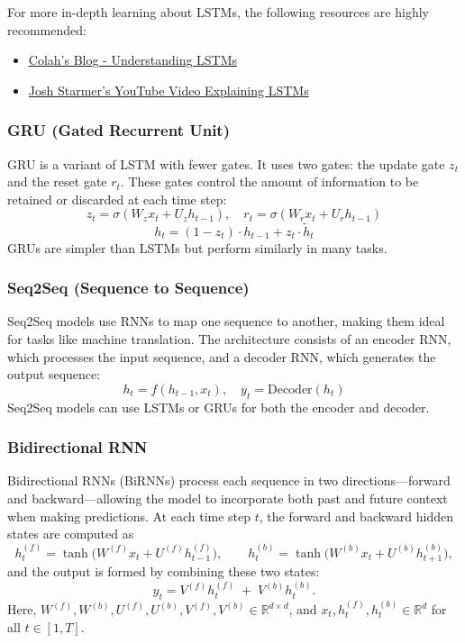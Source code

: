 \documentclass{article}
\begin{document}
For more in-depth learning about LSTMs, the following resources are highly recommended:
\begin{itemize}
    \item \href{https://colah.github.io/posts/2015-08-Understanding-LSTMs/}{Colah's Blog - Understanding LSTMs}
    \item \href{https://www.youtube.com/watch?v=YCzL96nL7j0}{Josh Starmer's YouTube Video Explaining LSTMs}
\end{itemize}

\subsubsection{GRU (Gated Recurrent Unit)}
GRU is a variant of LSTM with fewer gates. It uses two gates: the update gate \(z_t\) and the reset gate \(r_t\). These gates control the amount of information to be retained or discarded at each time step:
\[
z_t = \sigma(W_z x_t + U_z h_{t-1}), \quad r_t = \sigma(W_r x_t + U_r h_{t-1})
\]
\[
h_t = (1 - z_t) \cdot h_{t-1} + z_t \cdot \tilde{h}_t
\]
GRUs are simpler than LSTMs but perform similarly in many tasks.



\subsubsection{Seq2Seq (Sequence to Sequence)}
Seq2Seq models use RNNs to map one sequence to another, making them ideal for tasks like machine translation. The architecture consists of an encoder RNN, which processes the input sequence, and a decoder RNN, which generates the output sequence:
\[
h_t = f(h_{t-1}, x_t), \quad y_t = \text{Decoder}(h_t)
\]
Seq2Seq models can use LSTMs or GRUs for both the encoder and decoder.

\subsubsection{Bidirectional RNN}
Bidirectional RNNs (BiRNNs) process each sequence in two directions—forward and backward—allowing the model to incorporate both past and future context when making predictions. At each time step \(t\), the forward and backward hidden states are computed as
\[
h^{(f)}_t = \tanh\bigl(W^{(f)} x_t + U^{(f)} h^{(f)}_{t-1}\bigr), 
\qquad
h^{(b)}_t = \tanh\bigl(W^{(b)} x_t + U^{(b)} h^{(b)}_{t+1}\bigr),
\]
and the output is formed by combining these two states:
\[
y_t = V^{(f)} h^{(f)}_t \;+\; V^{(b)} h^{(b)}_t.
\]
Here, 
\(W^{(f)}, W^{(b)}, U^{(f)}, U^{(b)}, V^{(f)}, V^{(b)}\in\mathbb{R}^{d\times d}\),
and \(x_t,h^{(f)}_t,h^{(b)}_t\in\mathbb{R}^d\) for all \(t\in[1,T]\).
\end{document}
